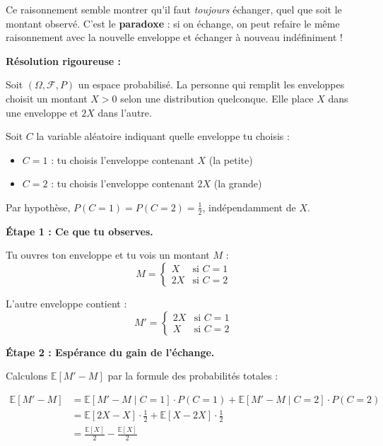 Ce raisonnement semble montrer qu'il faut \textit{toujours} échanger, quel que soit le montant observé. C'est le \textbf{paradoxe} : si on échange, on peut refaire le même raisonnement avec la nouvelle enveloppe et échanger à nouveau indéfiniment !

\bigskip

\textbf{Résolution rigoureuse :}

\bigskip

Soit $(\Omega, \mathcal{F}, P)$ un espace probabilisé. La personne qui remplit les enveloppes choisit un montant $X > 0$ selon une distribution quelconque. Elle place $X$ dans une enveloppe et $2X$ dans l'autre.

Soit $C$ la variable aléatoire indiquant quelle enveloppe tu choisis :
\begin{itemize}
    \item $C = 1$ : tu choisis l'enveloppe contenant $X$ (la petite)
    \item $C = 2$ : tu choisis l'enveloppe contenant $2X$ (la grande)
\end{itemize}

Par hypothèse, $P(C=1) = P(C=2) = \frac{1}{2}$, indépendamment de $X$.

\bigskip

\textbf{Étape 1 : Ce que tu observes.}

Tu ouvres ton enveloppe et tu vois un montant $M$ :
\[
M = \begin{cases} X & \text{si } C = 1 \\ 2X & \text{si } C = 2 \end{cases}
\]

L'autre enveloppe contient :
\[
M' = \begin{cases} 2X & \text{si } C = 1 \\ X & \text{si } C = 2 \end{cases}
\]

\bigskip

\textbf{Étape 2 : Espérance du gain de l'échange.}

Calculons $\mathbb{E}[M' - M]$ par la formule des probabilités totales :

\begin{align*}
\mathbb{E}[M' - M] &= \mathbb{E}[M' - M \mid C = 1]\cdot P(C=1) + \mathbb{E}[M' - M \mid C = 2]\cdot P(C=2) \\[8pt]
&= \mathbb{E}[2X - X]\cdot\frac{1}{2} + \mathbb{E}[X - 2X]\cdot\frac{1}{2} \\[8pt]
&= \frac{\mathbb{E}[X]}{2} - \frac{\mathbb{E}[X]}{2}
\end{align*}

